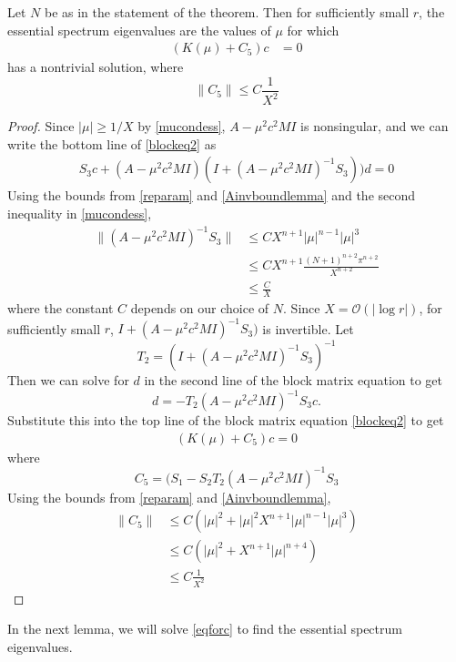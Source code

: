\documentclass[thesis.tex]{subfiles}
\begin{document}
\begin{lemma}\label{ceqlemma}
Let $N$ be as in the statement of the theorem. Then for sufficiently small $r$, the essential spectrum eigenvalues are the values of $\mu$ for which 
\begin{align}\label{eqforc}
(K(\mu) + C_5)c &= 0
\end{align}
has a nontrivial solution, where
\[
\|C_5\| \leq C \frac{1}{X^2}
\]
\begin{proof}
Since $|\mu| \geq 1/X$ by \cref{mucondess}, $A - \mu^2 c^2 MI$ is nonsingular, and we can write the bottom line of \eqref{blockeq2} as 
\begin{align}\label{blockeqbottom}
S_3 c + (A - \mu^2 c^2 MI)(I + (A - \mu^2 c^2 MI)^{-1} S_3))d = 0
\end{align}
Using the bounds from \cref{reparam} and \cref{Ainvboundlemma} and the second inequality in \cref{mucondess},
\begin{align*}
\|(A - \mu^2 c^2 MI)^{-1} S_3 \|
&\leq C X^{n+1} |\mu|^{n-1} |\mu|^3 \\
&\leq C X^{n+1}\frac{(N+1)^{n+2} \pi^{n+2}}{X^{n+2}} \\
&\leq \frac{C}{X}
\end{align*}
where the constant $C$ depends on our choice of $N$. Since $X = \mathcal{O}(|\log r|)$, for sufficiently small $r$, $I + (A - \mu^2 c^2 MI)^{-1} S_3)$ is invertible. Let
\[
T_2 = (I + (A - \mu^2 c^2 MI)^{-1} S_3)^{-1}
\]
Then we can solve for $d$ in the second line of the block matrix equation to get
\[
d = -T_2 (A - \mu^2 c^2 MI)^{-1}S_3 c.
\]
Substitute this into the top line of the block matrix equation \cref{blockeq2} to get
\begin{align*}
(K(\mu) + C_5) c = 0
\end{align*}
where 
\[
C_5 = (S_1 - S_2 T_2 (A - \mu^2 c^2 MI)^{-1}S_3
\]
Using the bounds from \cref{reparam} and \cref{Ainvboundlemma},
\begin{align*}
\| C_5 \| &\leq C \left( |\mu|^2 + |\mu|^2 X^{n+1} |\mu|^{n-1}|\mu|^3 \right) \\
&\leq C \left( |\mu|^2 + X^{n+1}|\mu|^{n+4} \right) \\
&\leq C \frac{1}{X^2}
\end{align*}
\end{proof}
\end{lemma}

In the next lemma, we will solve \cref{eqforc} to find the essential spectrum eigenvalues.
\end{document}
